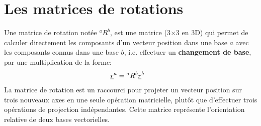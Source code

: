 







\section{Les matrices de rotations}
\label{sec:changematrice}

Une matrice de rotation notée $^aR^b$, est une matrice (3$\times$3 en 3D) qui permet de calculer directement les composants d'un vecteur position dans une base $a$ avec les composants connus dans une base $b$, i.e. effectuer un \textbf{changement de base}, par une multiplication de la forme:
\begin{align}
\underline{r}^a &= {}^aR^b \underline{r}^b
\label{eq:basechange}
\end{align} 
La matrice de rotation est un raccourci pour projeter un vecteur position sur trois nouveaux axes en une seule opération matricielle, plutôt que d'effectuer trois opérations de projection indépendantes. Cette matrice représente l'orientation relative de deux bases vectorielles.  

